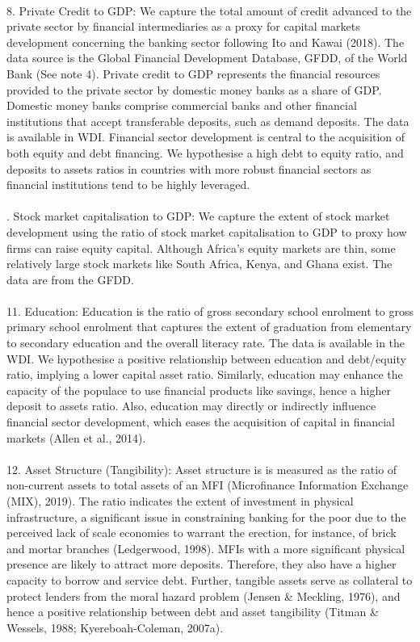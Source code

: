 \documentclass[a4paper,nobind]{templates/ociamthesis}
\begin{document}
\begin{longtabu}
\\
8. Private Credit to GDP: We capture the total amount of credit advanced to the private sector by financial intermediaries as a proxy for capital markets development concerning the banking sector following Ito and Kawai (2018). The data source is the Global Financial Development Database, GFDD, of the World Bank (See note 4). Private credit to GDP represents the financial resources provided to the private sector by domestic money banks as a share of GDP. Domestic money banks comprise commercial banks and other financial institutions that accept transferable deposits, such as demand deposits. The data is available in WDI. Financial sector development is central to the acquisition of both equity and debt financing. We hypothesise a high debt to equity ratio, and deposits to assets ratios in countries with more robust financial sectors as financial institutions tend to be highly leveraged.\\
\\
. Stock market capitalisation to GDP: We capture the extent of stock market development using the ratio of stock market capitalisation to GDP to proxy how firms can raise equity capital. Although Africa's equity markets are thin, some relatively large stock markets like South Africa, Kenya, and Ghana exist. The data are from the GFDD.\\
\\
11. Education: Education is the ratio of gross secondary school enrolment to gross primary school enrolment that captures the extent of graduation from elementary to secondary education and the overall literacy rate. The data is available in the WDI. We hypothesise a positive relationship between education and debt/equity ratio, implying a lower capital asset ratio. Similarly, education may enhance the capacity of the populace to use financial products like savings, hence a higher deposit to assets ratio.  Also, education may directly or indirectly influence financial sector development, which eases the acquisition of capital in financial markets (Allen et al., 2014).\\
\\
12. Asset Structure (Tangibility): Asset structure is is measured as the ratio of non-current assets to total assets of an MFI (Microfinance Information Exchange (MIX), 2019). The ratio indicates the extent of investment in physical infrastructure, a significant issue in constraining banking for the poor due to the perceived lack of scale economies to warrant the erection, for instance, of brick and mortar branches (Ledgerwood, 1998). MFIs with a more significant physical presence are likely to attract more deposits. Therefore, they also have a higher capacity to borrow and service debt. Further, tangible assets serve as collateral to protect lenders from the moral hazard problem (Jensen \& Meckling, 1976), and hence a positive relationship between debt and asset tangibility (Titman \& Wessels, 1988; Kyereboah-Coleman, 2007a).\\

\end{longtabu}
\end{document}
